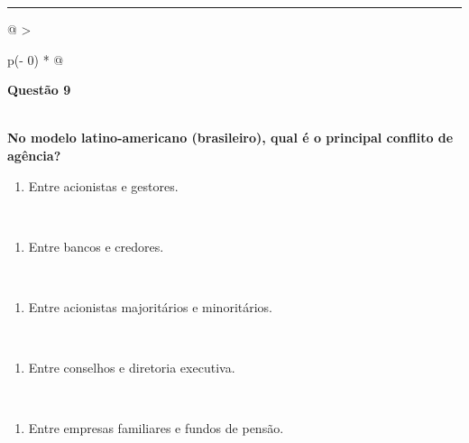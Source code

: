 \documentclass[
]{book}
\providecommand{\tightlist}{%
  \setlength{\itemsep}{0pt}\setlength{\parskip}{0pt}}
\begin{document}
\begin{center}\rule{0.5\linewidth}{0.5pt}\end{center}

\begin{longtable}[]{@{}
  >{\raggedright\arraybackslash}p{(\columnwidth - 0\tabcolsep) * }@{}}
\toprule\noalign{}
\begin{minipage}[b]{\linewidth}\raggedright
\textbf{Questão 9}
\end{minipage} \\
\midrule\noalign{}
\endhead
\bottomrule\noalign{}
\endlastfoot
\textbf{No modelo latino-americano (brasileiro), qual é o principal conflito de agência?} \\
\begin{minipage}[t]{\linewidth}\raggedright
\begin{enumerate}
\def\labelenumi{\alph{enumi})}
\tightlist
\item
  Entre acionistas e gestores.
\end{enumerate}
\end{minipage} \\
\begin{minipage}[t]{\linewidth}\raggedright
\begin{enumerate}
\def\labelenumi{\alph{enumi})}
\setcounter{enumi}{1}
\tightlist
\item
  Entre bancos e credores.
\end{enumerate}
\end{minipage} \\
\begin{minipage}[t]{\linewidth}\raggedright
\begin{enumerate}
\def\labelenumi{\alph{enumi})}
\setcounter{enumi}{2}
\tightlist
\item
  Entre acionistas majoritários e minoritários.
\end{enumerate}
\end{minipage} \\
\begin{minipage}[t]{\linewidth}\raggedright
\begin{enumerate}
\def\labelenumi{\alph{enumi})}
\setcounter{enumi}{3}
\tightlist
\item
  Entre conselhos e diretoria executiva.
\end{enumerate}
\end{minipage} \\
\begin{minipage}[t]{\linewidth}\raggedright
\begin{enumerate}
\def\labelenumi{\alph{enumi})}
\setcounter{enumi}{4}
\tightlist
\item
  Entre empresas familiares e fundos de pensão.
\end{enumerate}
\end{minipage} \\
\end{longtable}
\end{document}
